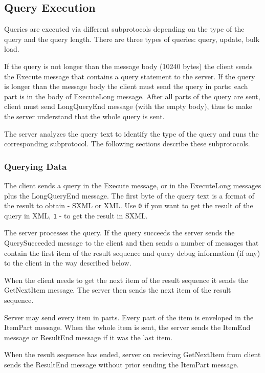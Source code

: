 \documentclass[a4paper,12pt]{article}
\begin{document}
\subsection{Query Execution}

Queries are executed via different subprotocols depending on the type of the query and the query length. There are three types of queries: query, update, bulk load. 

If the query is not longer than the message body (10240 bytes) the client sends the Execute message that contains a query statement to the server. 
If the query is longer than the message body the client must send the query in parts: each part is in the body of ExecuteLong message. After all parts of the query are sent, client must send LongQueryEnd message (with the empty body), thus to make the server understand that the whole query is sent.


The server analyzes the query text to identify the type of the query and runs the corresponding subprotocol. The following sections describe these subprotocols. 

\subsubsection{Querying Data }

The client sends a query in the Execute message, or in the ExecuteLong messages plus the LongQueryEnd message. The first byte of the query text is a format of the result to obtain - SXML \cite{paper:sxml} or XML. Use \verb!0! if you want to get the result of the query in XML, \verb!1! - to get the result in SXML.

The server processes the query. If the query succeeds the server sends the QuerySucceeded message to the client and then sends a number of messages that contain the first item of the result sequence and query debug information (if any) to the client in the way described below.

When the client needs to get the next item of the result sequence it sends the GetNextItem message. The server then sends the next item of the result sequence.

Server may send every item in parts. Every part of the item is enveloped in the ItemPart message. When the whole item is sent, the server sends the ItemEnd message or ResultEnd message if it was the last item.

When the result sequence has ended, server on recieving GetNextItem from client sends the ResultEnd message without prior sending the ItemPart message.
\end{document}
